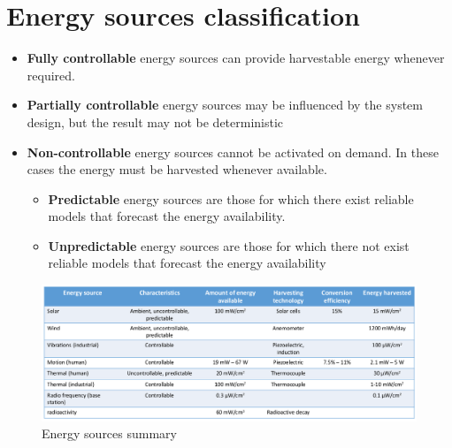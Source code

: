 \section{Energy sources classification}
\begin{itemize}
   \item \textbf{Fully controllable} energy sources can provide harvestable energy whenever required.
   \item \textbf{Partially controllable} energy sources may be influenced by the system design, but the result may not be deterministic
   \item \textbf{Non-controllable} energy sources cannot be activated on demand.
   In these cases the energy must be harvested whenever available.
   \begin{itemize}
      \item \textbf{Predictable} energy sources are those for which there exist reliable models
      that forecast the energy availability.
      \item \textbf{Unpredictable}
      energy sources are those for which there not exist reliable models that forecast the energy availability
   \end{itemize}
\end{itemize}

\begin{figure}[htbp]
   \centering
   \includegraphics{images/energysources.png}
   \caption{Energy sources summary}
   \label{fig:energysources}
\end{figure}

